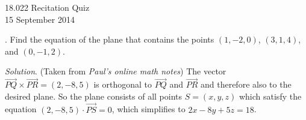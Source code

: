 \documentclass[11pt]{article}
\theoremstyle{definition}
\newcounter{prob}
\newcommand\itm{\theprob.  \stepcounter{prob}}
\newcommand\sol[2]{\textit{Solution}. #1}
\newcommand\sol[2]{#2}
\begin{document}
\thispagestyle{empty}

\begin{center}
  18.022 Recitation Quiz \iftoggle{solutions}{(with solutions)}{} \\
  15 September 2014 \\
\end{center}

\itm Find the equation of the plane that contains the points $(1,-2,0)$,
$(3,1,4)$, and $(0,-1,2)$. 

\sol{(Taken from \textit{Paul's online math notes}) The vector
  $\overrightarrow{PQ} \times \overrightarrow{PR} = (2,-8,5)$ is orthogonal
  to $\overrightarrow{PQ}$ and $\overrightarrow{PR}$ and therefore also to
  the desired plane. So the plane consists of all points $S = (x,y,z)$
  which satisfy the equation $(2,-8,5)\cdot \overrightarrow{PS} = 0$, which
  simplifies to $\boxed{2x - 8y + 5z = 18}$.}{}
\end{document}
